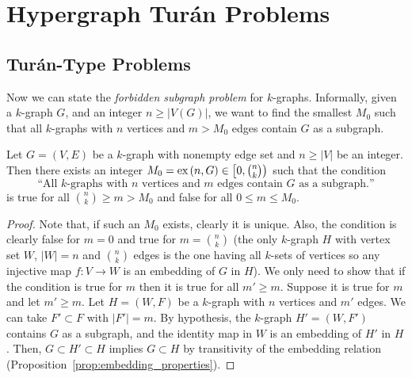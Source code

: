 \section{Hypergraph Turán Problems}\label{sec:extremal}

\subsection{Turán-Type Problems}\label{subsec:turan}

Now we can state the \emph{forbidden subgraph problem} for $k$-graphs.
Informally, given a $k$-graph $G$, and an integer $n \geq |V(G)|$,
we want to find the smallest $M_0$ such that all $k$-graphs with $n$ vertices and $m > M_0$ edges
contain $G$ as a subgraph.

\begin{proposition} \label{prop:extremal}
    Let $G = (V, E)$ be a $k$-graph with nonempty edge set and $n \geq |V|$ be an integer.
    Then there exists an integer $M_0 = \text{ex} \left( n, G \right) \in \left[ 0, \binom{n}{k}\right)$ such that
    the condition
    \[
        \text{``All $k$-graphs with $n$ vertices and $m$ edges contain $G$ as a subgraph.''}
    \]
    is true for all $\binom{n}{k} \geq m > M_0$ and false for all $0 \leq m \leq M_0$.

    \begin{proof}
        Note that, if such an $M_0$ exists, clearly it is unique.
        Also, the condition is clearly false for $m = 0$ and
        true for $m = \binom{n}{k}$
        (the only $k$-graph $H$ with vertex set $W$, $|W|=n$ and $\binom{n}{k}$ edges
        is the one having all $k$-sets of vertices so any injective map $f: V \to W$
        is an embedding of $G$ in $H$).
        We only need to show that if the condition is true for $m$ then it is true for
        all $m' \geq m$.
        Suppose it is true for $m$ and let $m' \geq m$.
        Let $H = (W, F)$ be a $k$-graph with $n$ vertices and $m'$ edges.
        We can take $F' \subset F$ with $|F'| = m$.
        By hypothesis, the $k$-graph $H' = (W, F')$ contains $G$ as a subgraph,
        and the identity map in $W$ is an embedding of $H'$ in $H$.
        Then, $G \subset H' \subset H$ implies $G \subset H$ by transitivity of the embedding
        relation (Proposition~\ref{prop:embedding_properties}).

    \end{proof}

\end{proposition}

